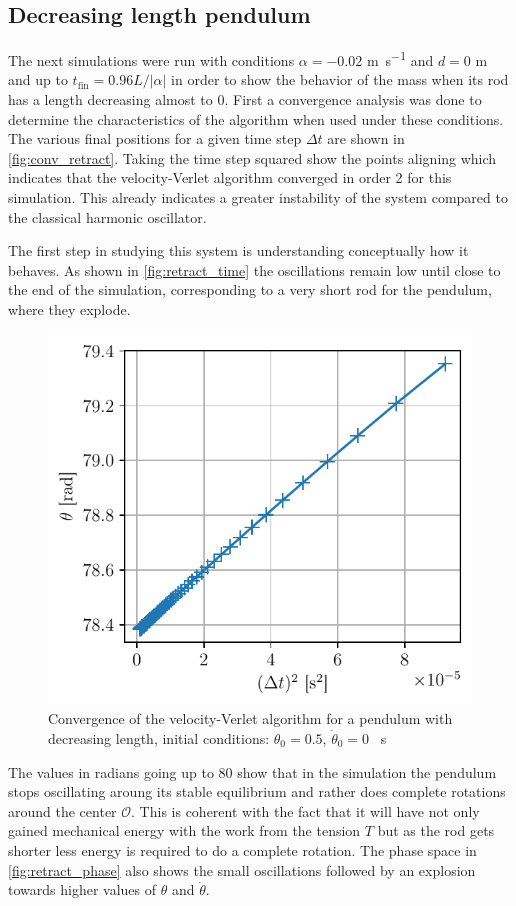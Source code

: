 \subsection{Decreasing length pendulum}
The next simulations were run with conditions $\alpha=-0.02$ \si{\meter\per\second} and $d=0$ \si{\meter} and up to $t_\textrm{fin}=0.96L/|\alpha|$ in order to show the behavior of the mass when its rod has a length decreasing almost to 0. First a convergence analysis was done to determine the characteristics of the algorithm when used under these conditions. The various final positions for a given time step $\Delta t$ are shown in \autoref{fig:conv_retract}. Taking the time step squared show the points aligning which indicates that the velocity-Verlet algorithm converged in order 2 for this simulation. This already indicates a greater instability of the system compared to the classical harmonic oscillator.

The first step in studying this system is understanding conceptually how it behaves. As shown in \autoref{fig:retract_time} the oscillations remain low until close to the end of the simulation, corresponding to a very short rod for the pendulum, where they explode.

\begin{figure}
    \centering
    \includegraphics[width=\linewidth]{figures/converg_retraction.pdf}
    \caption{Convergence of the velocity-Verlet algorithm for a pendulum with decreasing length, initial conditions: $\theta_0 = 0.5$, $\dot{\theta}_0 = 0$ \si{\per\second}}
    \label{fig:conv_retract}
\end{figure}
The values in radians going up to 80 show that in the simulation the pendulum stops oscillating aroung its stable equilibrium and rather does complete rotations around the center $\mathcal{O}$. This is coherent with the fact that it will have not only gained mechanical energy with the work from the tension $T$ but as the rod gets shorter less energy is required to do a complete rotation. The phase space in \autoref{fig:retract_phase} also shows the small oscillations followed by an explosion towards higher values of $\theta$ and $\dot\theta$.

